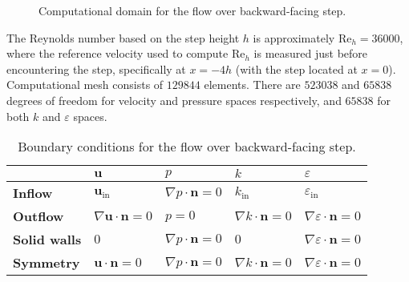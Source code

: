 \begin{figure}[htbp]
    \captionsetup{width=0.85\textwidth}
    \caption{Computational domain for the flow over backward-facing step.} 
    \label{fig: backward facing step}
\end{figure}

The Reynolds number based on the step height \(h\) is approximately \(\text{Re}_h = 36000\), where the reference velocity used to compute \(\text{Re}_h\) is measured just before encountering the step, specifically at \(x = -4h\) (with the step located at \(x=0\)). Computational mesh consists of \(129 844\) elements. There are \(523 038\) and \(65 838\) degrees of freedom for velocity and pressure spaces respectively, and \(65 838\) for both \(k\) and \(\varepsilon\) spaces. 

\begin{table}
    \centering
    \begin{tabular}{m{2.1cm} m{1.75cm} m{1.75cm} m{1.75cm} m{1.75cm}}
        \hline
        & $\mathbf{u}$ & $p$ & $k$ & $\varepsilon$ \\
        \hline
        \textbf{Inflow} & $\mathbf{u}_{\text{in}}$ & $\nabla p \cdot \mathbf{n} = 0$
        & $k_{\text{in}}$ & $\varepsilon_{\text{in}}$
        \\
        \textbf{Outflow} & $\nabla \mathbf{u} \cdot \mathbf{n} = 0$ & $p=0$ 
        & $\nabla k \cdot \mathbf{n} = 0$ & $\nabla \varepsilon\cdot \mathbf{n} = 0$
        \\
        \textbf{Solid walls} & $0$ & $\nabla p \cdot \mathbf{n} = 0$ 
        & $0$ & $\nabla \varepsilon \cdot \mathbf{n} = 0$
        \\
        \textbf{Symmetry} & $\mathbf{u} \cdot \mathbf{n} = 0$ & $\nabla p \cdot \mathbf{n} = 0$ 
         & $\nabla k \cdot \mathbf{n} = 0$ & $\nabla \varepsilon \cdot \mathbf{n} = 0$
        \\
        \hline
    \end{tabular}
    \captionsetup{width=0.85\textwidth}
    \caption{Boundary conditions for the flow over backward-facing step.}
    \label{tab: boundary conditions for the backward facing step}
\end{table}

